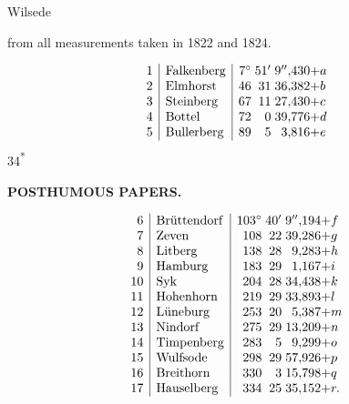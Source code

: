 \medskip
{\centering
[3.]\par\smallskip
Wilsede\par\smallskip
from all measurements taken in 1822 and 1824.\par{}\par}
\[
\begin{array}{@{}r|l|r@{\;}r@{\;}r@{}l@{}}
 1&\text{Falkenberg}&7^\circ&51'&9''{,}430&+a\\
 2&\text{Elmhorst}&46&31&36{,}382&+b\\
 3&\text{Steinberg}&67&11&27{,}430&+c\\
 4&\text{Bottel}&72&0&39{,}776&+d\\
 5&\text{Bullerberg}&89&5&3{,}816&+e
\end{array}
\]
\noindent\hfill{\small 34\textsuperscript{*}}\hspace*{.12\linewidth}\par

\par\clearpage
\noindent{}\hfill{\small\textbf{POSTHUMOUS PAPERS.}}\hfill\null\par\medskip

\[
\begin{array}{@{}r|l|r@{\;}r@{\;}r@{}l@{}}
 6&\text{Brüttendorf}&103^\circ&40'&9''{,}194&+f\\
 7&\text{Zeven}&108&22&39{,}286&+g\\
 8&\text{Litberg}&138&28&9{,}283&+h\\
 9&\text{Hamburg}&183&29&1{,}167&+i\\
 10&\text{Syk}&204&28&34{,}438&+k\\
 11&\text{Hohenhorn}&219&29&33{,}893&+l\\
 12&\text{Lüneburg}&253&20&5{,}387&+m\\
 13&\text{Nindorf}&275&29&13{,}209&+n\\
 14&\text{Timpenberg}&283&5&9{,}299&+o\\
 15&\text{Wulfsode}&298&29&57{,}926&+p\\
 16&\text{Breithorn}&330&3&15{,}798&+q\\
 17&\text{Hauselberg}&334&25&35{,}152&+r.
\end{array}
\]

